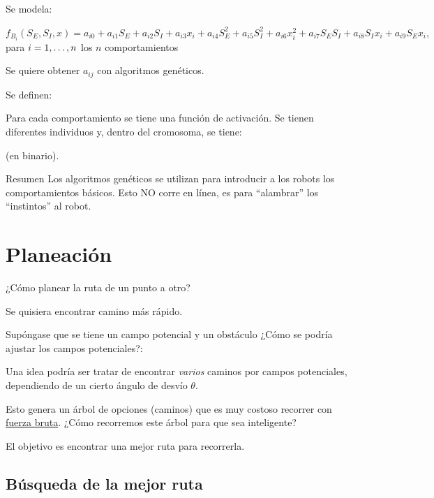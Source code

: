 Se modela:

$f_{B_i}(S_E, S_I, x) = a_{i0} + a_{i1} S_E + a_{i2} S_I + a_{i3} x_i +  a_{i4} S_E^2 + a_{i5} S_I^2 + a_{i6} x_i^2 + a_{i7} S_E S_I + a_{i8} S_I x_i + a_{i9} S_E x_i ,$ para $i=1,\ldotp \ldotp \ldotp, n$ los $n$ comportamientos

Se quiere obtener $a_{ij}$ con algoritmos genéticos. 

Se definen: 


Para cada comportamiento se tiene una función de activación. Se tienen diferentes individuos y, dentro
del cromosoma, se tiene:



(en binario).

\begin{scaja}
	Resumen
	Los algoritmos genéticos se utilizan para introducir a los robots los comportamientos básicos. Esto NO corre
	en línea, es para “alambrar” los “instintos” al robot. 
\end{scaja}

\section{Planeación}

¿Cómo planear la ruta de un punto a otro? 


Se quisiera encontrar camino más rápido.

Supóngase que se tiene un campo potencial y un obstáculo
¿Cómo se podría ajustar los campos potenciales?:


Una idea podría ser tratar de encontrar \textit{varios} caminos por campos potenciales, dependiendo de un cierto
ángulo de desvío $\theta$.

Esto genera un árbol de opciones (caminos) que es muy costoso recorrer con \underline{fuerza bruta}. ¿Cómo recorremos
este árbol para que sea inteligente?

El objetivo es encontrar una mejor ruta para recorrerla. 

\subsection{Búsqueda de la mejor ruta}

